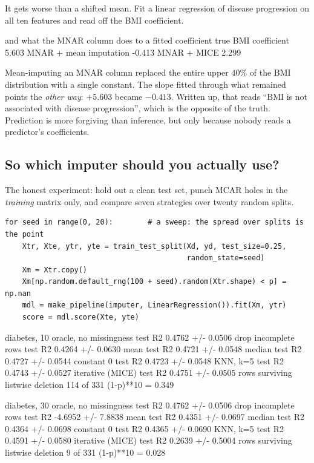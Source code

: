 \documentclass[11pt]{article}
\begin{document}
It gets worse than a shifted mean. Fit a linear regression of disease
progression on all ten features and read off the BMI coefficient.

\begin{codeout}
and what the MNAR column does to a fitted coefficient
  true BMI coefficient             5.603
  MNAR + mean imputation          -0.413
  MNAR + MICE                      2.299
\end{codeout}

\begin{caution}
Mean-imputing an MNAR column replaced the entire upper $40\%$ of the BMI
distribution with a single constant. The slope fitted through what remained
points the \emph{other way}: $+5.603$ became $-0.413$. Written up, that reads
``BMI is not associated with disease progression'', which is the opposite of
the truth. Prediction is more forgiving than inference, but only because
nobody reads a predictor's coefficients.
\end{caution}

\subsection{So which imputer should you actually use?}
\label{sec:whichimputer}

The honest experiment: hold out a clean test set, punch MCAR holes in the
\emph{training} matrix only, and compare seven strategies over twenty random
splits.

\begin{lstlisting}
for seed in range(0, 20):        # a sweep: the spread over splits is the point
    Xtr, Xte, ytr, yte = train_test_split(Xd, yd, test_size=0.25,
                                          random_state=seed)
    Xm = Xtr.copy()
    Xm[np.random.default_rng(100 + seed).random(Xtr.shape) < p] = np.nan
    mdl = make_pipeline(imputer, LinearRegression()).fit(Xm, ytr)
    score = mdl.score(Xte, yte)
\end{lstlisting}
\begin{codeout}
diabetes, 10%
  oracle, no missingness   test R2 0.4762  +/- 0.0506
  drop incomplete rows     test R2 0.4264  +/- 0.0630
  mean                     test R2 0.4721  +/- 0.0548
  median                   test R2 0.4727  +/- 0.0544
  constant 0               test R2 0.4723  +/- 0.0548
  KNN, k=5                 test R2 0.4743  +/- 0.0527
  iterative (MICE)         test R2 0.4751  +/- 0.0505
  rows surviving listwise deletion 114 of 331   (1-p)**10 = 0.349
\end{codeout}
\begin{codeout}
diabetes, 30%
  oracle, no missingness   test R2 0.4762  +/- 0.0506
  drop incomplete rows     test R2 -4.6952  +/- 7.8838
  mean                     test R2 0.4351  +/- 0.0697
  median                   test R2 0.4364  +/- 0.0698
  constant 0               test R2 0.4365  +/- 0.0690
  KNN, k=5                 test R2 0.4591  +/- 0.0580
  iterative (MICE)         test R2 0.2639  +/- 0.5004
  rows surviving listwise deletion 9 of 331   (1-p)**10 = 0.028
\end{codeout}
\end{document}
